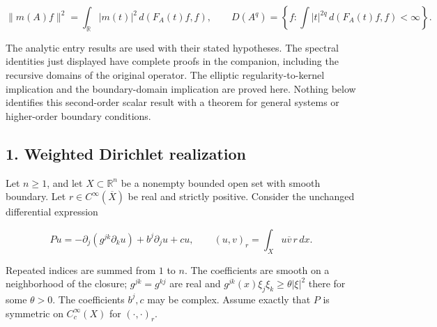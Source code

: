 \documentclass[
  11pt,
]{article}
\makeatletter
\let\ReaderOriginalAnchorStart\hyper@anchorstart
\let\ReaderOriginalAnchorEnd\hyper@anchorend
\let\ReaderPendingAliases\@empty
\def\ReaderArmAliases#1{\gdef\ReaderPendingAliases{#1}}
\def\hyper@anchorstart#1{\ReaderIfNativeAnchorTF{#1}{\ReaderPendingAliases\global\let\ReaderPendingAliases\@empty}{}\ReaderOriginalAnchorStart{#1}}
\makeatother
\begin{document}
\[
 \|m(A)f\|^2=\int_{\mathbb R}|m(t)|^2\,d(F_A(t)f,f),
 \qquad D(A^q)=\left\{f:\int |t|^{2q}\,d(F_A(t)f,f)<\infty\right\}.
 \tag{DSP1}
\]

The analytic entry results are used with their stated hypotheses. The
spectral identities just displayed have complete proofs in the
companion, including the recursive domains of the original operator. The
elliptic regularity-to-kernel implication and the boundary-domain
implication are proved here. Nothing below identifies this second-order
scalar result with a theorem for general systems or higher-order
boundary conditions.

\ReaderArmAliases{\ReaderOriginalAnchorStart{AN03-DSP-001}\ReaderOriginalAnchorEnd\begingroup\expandafter\def\csname @currentHref\endcsname{AN03-DSP-001}\label{AN03-DSP-001}\endgroup\ReaderOriginalAnchorStart{an03-dsp-001-weighted-dirichlet-realization}\ReaderOriginalAnchorEnd\begingroup\expandafter\def\csname @currentHref\endcsname{an03-dsp-001-weighted-dirichlet-realization}\label{an03-dsp-001-weighted-dirichlet-realization}\endgroup\ReaderOriginalAnchorStart{1-weighted-dirichlet-realization}\ReaderOriginalAnchorEnd\begingroup\expandafter\def\csname @currentHref\endcsname{1-weighted-dirichlet-realization}\label{1-weighted-dirichlet-realization}\endgroup\ReaderOriginalAnchorStart{weighted-dirichlet-realization}\ReaderOriginalAnchorEnd}
\subsection{1. Weighted Dirichlet
realization}\label{weighted-dirichlet-realization}

Let \(n\geq1\), and let \(X\subset\mathbb R^n\) be a nonempty bounded
open set with smooth boundary. Let \(r\in C^\infty(\overline X)\) be
real and strictly positive. Consider the unchanged differential
expression

\[
 Pu=-\partial_j(g^{jk}\partial_k u)+b^j\partial_j u+cu,
 \qquad (u,v)_r=\int_Xu\overline v\,r\,dx.
 \tag{DSP2}
\]

Repeated indices are summed from \(1\) to \(n\). The coefficients are
smooth on a neighborhood of the closure; \(g^{jk}=g^{kj}\) are real and
\(g^{jk}(x)\xi_j\xi_k\geq\theta|\xi|^2\) there for some \(\theta>0\).
The coefficients \(b^j,c\) may be complex. Assume exactly that \(P\) is
symmetric on \(C_c^\infty(X)\) for \((\cdot,\cdot)_r\).
\end{document}
